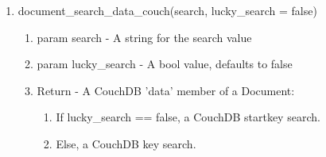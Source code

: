 \begin{enumerate}
	\item document\_search\_data\_couch(search, lucky\_search = false)
	\begin{enumerate}
		\item param search - A string for the search value
		\item param lucky\_search - A bool value, defaults to false
		\item Return -  A CouchDB 'data' member of a Document:
		\begin{enumerate}
			\item If lucky\_search == false, a CouchDB startkey search.
			\item Else, a CouchDB key search.
		\end{enumerate}
	\end{enumerate}

\end{enumerate}
